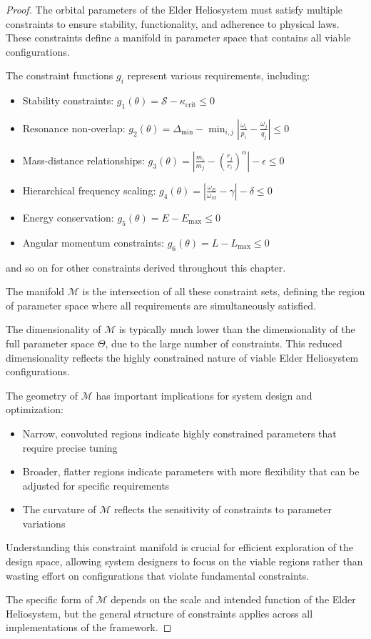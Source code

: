 \begin{proof}
The orbital parameters of the Elder Heliosystem must satisfy multiple constraints to ensure stability, functionality, and adherence to physical laws. These constraints define a manifold in parameter space that contains all viable configurations.

The constraint functions $g_i$ represent various requirements, including:
\begin{itemize}
    \item Stability constraints: $g_1(\theta) = \mathcal{S} - \kappa_{\text{crit}} \leq 0$
    \item Resonance non-overlap: $g_2(\theta) = \Delta_{\text{min}} - \min_{i,j} \left|\frac{\omega_i}{p_i} - \frac{\omega_j}{q_j}\right| \leq 0$
    \item Mass-distance relationships: $g_3(\theta) = \left|\frac{m_i}{m_j} - \left(\frac{r_j}{r_i}\right)^{\alpha}\right| - \epsilon \leq 0$
    \item Hierarchical frequency scaling: $g_4(\theta) = \left|\frac{\omega_E}{\omega_M} - \gamma\right| - \delta \leq 0$
    \item Energy conservation: $g_5(\theta) = E - E_{\text{max}} \leq 0$
    \item Angular momentum constraints: $g_6(\theta) = L - L_{\text{max}} \leq 0$
\end{itemize}
and so on for other constraints derived throughout this chapter.

The manifold $\mathcal{M}$ is the intersection of all these constraint sets, defining the region of parameter space where all requirements are simultaneously satisfied.

The dimensionality of $\mathcal{M}$ is typically much lower than the dimensionality of the full parameter space $\Theta$, due to the large number of constraints. This reduced dimensionality reflects the highly constrained nature of viable Elder Heliosystem configurations.

The geometry of $\mathcal{M}$ has important implications for system design and optimization:
\begin{itemize}
    \item Narrow, convoluted regions indicate highly constrained parameters that require precise tuning
    \item Broader, flatter regions indicate parameters with more flexibility that can be adjusted for specific requirements
    \item The curvature of $\mathcal{M}$ reflects the sensitivity of constraints to parameter variations
\end{itemize}

Understanding this constraint manifold is crucial for efficient exploration of the design space, allowing system designers to focus on the viable regions rather than wasting effort on configurations that violate fundamental constraints.

The specific form of $\mathcal{M}$ depends on the scale and intended function of the Elder Heliosystem, but the general structure of constraints applies across all implementations of the framework.
\end{proof}

